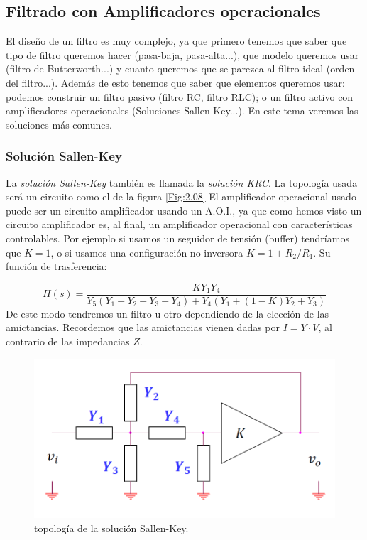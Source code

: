 \documentclass[12pt,a4paper]{article}
\numberwithin{equation}{section}
\numberwithin{figure}{section}
\begin{document}
\subsection{Filtrado con Amplificadores operacionales}

El diseño de un filtro es muy complejo, ya que primero tenemos que saber que tipo de filtro queremos hacer (pasa-baja, pasa-alta...), que modelo queremos usar (filtro de Butterworth...) y cuanto queremos que se parezca al filtro ideal (orden del filtro...). Además de esto tenemos que saber que elementos queremos usar: podemos construir un filtro pasivo (filtro RC, filtro RLC); o un filtro activo con amplificadores operacionales (Soluciones Sallen-Key...). En este tema veremos las soluciones más comunes. \\

\subsubsection{Solución Sallen-Key}

La \textit{solución Sallen-Key} también es llamada la \textit{solución KRC}. La topología usada será un circuito como el de la figura \ref{Fig:2.08} El amplificador operacional usado puede ser un circuito amplificador usando un A.O.I., ya que como hemos visto un circuito amplificador es, al final, un amplificador operacional con características controlables. Por ejemplo si usamos un seguidor de tensión (buffer) tendríamos que $K=1$, o si usamos una configuración no inversora $K=1+R_2/R_1$. Su función de trasferencia:

\begin{equation}
H(s) = \dfrac{K Y_1 Y_4}{Y_5(Y_1+Y_2+Y_3+Y_4) + Y_4(Y_1+(1-K)Y_2+Y_3)}
\end{equation}
De este modo tendremos un filtro u otro dependiendo de la elección de las amictancias. Recordemos que las amictancias vienen dadas por $I = Y \cdot V$, al contrario de las impedancias $Z$. 

\begin{figure}[h!] \centering
\includegraphics[scale=0.55]{2.4-KRC}
\caption{topología de la solución Sallen-Key.}
\label{Fig:2.19}
\end{figure}
\end{document}
